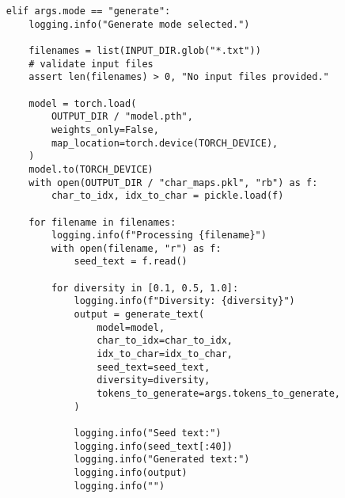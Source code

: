 \documentclass{article}
\begin{document}
\begin{lstlisting}
    elif args.mode == "generate":
        logging.info("Generate mode selected.")

        filenames = list(INPUT_DIR.glob("*.txt"))
        # validate input files
        assert len(filenames) > 0, "No input files provided."

        model = torch.load(
            OUTPUT_DIR / "model.pth",
            weights_only=False,
            map_location=torch.device(TORCH_DEVICE),
        )
        model.to(TORCH_DEVICE)
        with open(OUTPUT_DIR / "char_maps.pkl", "rb") as f:
            char_to_idx, idx_to_char = pickle.load(f)

        for filename in filenames:
            logging.info(f"Processing {filename}")
            with open(filename, "r") as f:
                seed_text = f.read()

            for diversity in [0.1, 0.5, 1.0]:
                logging.info(f"Diversity: {diversity}")
                output = generate_text(
                    model=model,
                    char_to_idx=char_to_idx,
                    idx_to_char=idx_to_char,
                    seed_text=seed_text,
                    diversity=diversity,
                    tokens_to_generate=args.tokens_to_generate,
                )

                logging.info("Seed text:")
                logging.info(seed_text[:40])
                logging.info("Generated text:")
                logging.info(output)
                logging.info("")
\end{lstlisting}
\end{document}
